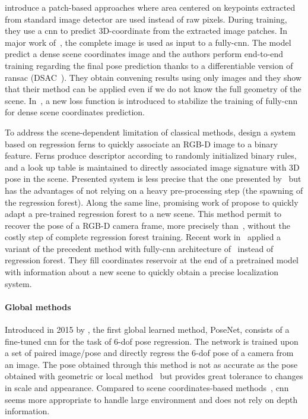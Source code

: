 \citet{Duong2018} introduce a patch-based approaches where area centered on keypoints extracted from standard image detector are used instead of raw pixels. During training, they use a \ac{cnn} to predict 3D-coordinate from the extracted image patches. In major work of~\citet{Brachmann2017b}, the complete image is used as input to a fully-\ac{cnn}. The model predict a dense scene coordinates image and the authors perform end-to-end training regarding the final pose prediction thanks to a differentiable version of \ac{ransac} (DSAC~\citep{Brachmann2017}). They obtain convening results using only images and they show that their method can be applied even if we do not know the full geometry of the scene. In~\citep{Li2018}, a new loss function is introduced to stabilize the training of fully-\ac{cnn} for dense scene coordinates prediction.

To address the scene-dependent limitation of classical methods, \citet{Glocker2015} design a system based on regression ferns to quickly associate an RGB-D image to a binary feature. Ferns produce descriptor according to randomly initialized binary rules, and a look up table is maintained to directly associated image signature with 3D pose in the scene. Presented system is less precise that the one presented by~\citet{Shotton2013} but has the advantages of not relying on a heavy pre-processing step (\ie the spawning of the regression forest). Along the same line, promising work of \citet{Cavallari, Cavallari2018} propose to quickly adapt a pre-trained regression forest to a new scene. This method permit to recover the pose of a RGB-D camera frame, more precisely than~\citet{Glocker2013,Glocker2015}, without the costly step of complete regression forest training. Recent work in~\citep{Cavallari2019} applied a variant of the precedent method with fully-\ac{cnn} architecture of~\citep{Brachmann2017b} instead of regression forest. They fill coordinates reservoir at the end of a pretrained model with information about a new scene to quickly obtain a precise localization system. \citep{EricBrachmann2019}

\paragraph{Global methods}
\label{para:cnn_regressor}
Introduced in 2015 by \citet{Kendall2015}, the first global learned method, PoseNet, consists of a fine-tuned \ac{cnn} for the task of 6-\ac{dof} pose regression. The network is trained upon a set of paired image/pose and directly regress the 6-\ac{dof} pose of a camera from an image. The pose obtained through this method is not as accurate as the pose obtained with geometric or local method~\citep{Feng2016a,Brachmann2017b} but provides great tolerance to changes in scale and appearance. Compared to scene coordinates-based methods~\citep{Shotton2013,Li2018}, \ac{cnn} seems more appropriate to handle large environment and does not rely on depth information.

